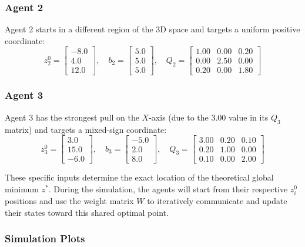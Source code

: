 \documentclass[11pt, a4paper]{article}
\begin{document}
\subsubsection*{Agent 2}
Agent 2 starts in a different region of the 3D space and targets a uniform positive coordinate:
$$
z_2^0 = \begin{bmatrix} -8.0 \\ 4.0 \\ 12.0 \end{bmatrix}, \quad
b_2 = \begin{bmatrix} 5.0 \\ 5.0 \\ 5.0 \end{bmatrix}, \quad
Q_2 = \begin{bmatrix} 
1.00 & 0.00 & 0.20 \\ 
0.00 & 2.50 & 0.00 \\ 
0.20 & 0.00 & 1.80 
\end{bmatrix}
$$

\subsubsection*{Agent 3}
Agent 3 has the strongest pull on the $X$-axis (due to the $3.00$ value in its $Q_3$ matrix) and targets a mixed-sign coordinate:
$$
z_3^0 = \begin{bmatrix} 3.0 \\ 15.0 \\ -6.0 \end{bmatrix}, \quad
b_3 = \begin{bmatrix} -5.0 \\ 2.0 \\ 8.0 \end{bmatrix}, \quad
Q_3 = \begin{bmatrix} 
3.00 & 0.20 & 0.10 \\ 
0.20 & 1.00 & 0.00 \\ 
0.10 & 0.00 & 2.00 
\end{bmatrix}
$$

These specific inputs determine the exact location of the theoretical global minimum $z^*$. During the simulation, the agents will start from their respective $z_i^0$ positions and use the weight matrix $W$ to iteratively communicate and update their states toward this shared optimal point.
\newpage

\subsubsection{Simulation Plots}
\label{sec:figures}
\end{document}
